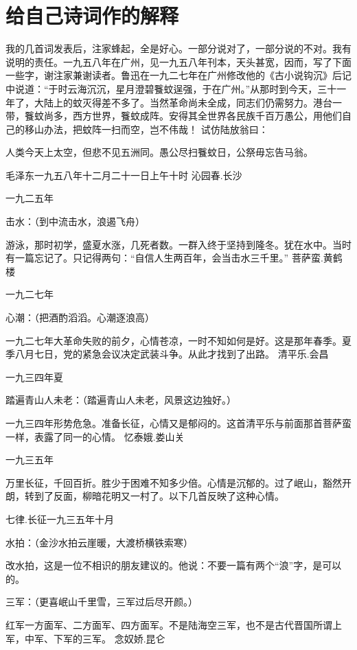 \section[给自己诗词作的解释 ]{给自己诗词作的解释 }


我的几首词发表后，注家蜂起，全是好心。一部分说对了，一部分说的不对。我有说明的责任。一九五八年在广州，见一九五八年刊本，天头甚宽，因而，写了下面一些字，谢注家兼谢读者。鲁迅在一九二七年在广州修改他的《古小说钩沉》后记中说道：“于时云海沉沉，星月澄碧餮蚊逞强，于在广州。”从那时到今天，三十一年了，大陆上的蚊灭得差不多了。当然革命尚未全成，同志们仍需努力。港台一带，餮蚊尚多，西方世界，餮蚊成阵。安得其全世界各民族千百万愚公，用他们自己的移山办法，把蚊阵一扫而空，岂不伟哉！
试仿陆放翁曰：

人类今天上太空，但悲不见五洲同。愚公尽扫餮蚊日，公祭毋忘告马翁。

毛泽东一九五八年十二月二十一日上午十时
沁园春.长沙

一九二五年

击水：（到中流击水，浪遏飞舟）

游泳，那时初学，盛夏水涨，几死者数。一群入终于坚持到隆冬。犹在水中。当时有一篇忘记了。只记得两句：“自信人生两百年，会当击水三千里。”
菩萨蛮.黄鹤楼

一九二七年

心潮：（把酒酌滔滔。心潮逐浪高）

一九二七年大革命失败的前夕，心情苍凉，一时不知如何是好。这是那年春季。夏季八月七日，党的紧急会议决定武装斗争。从此才找到了出路。
清平乐.会昌

一九三四年夏

踏遍青山人未老：（踏遍青山人未老，风景这边独好。）

一九三四年形势危急。准备长征，心情又是郁闷的。这首清平乐与前面那首菩萨蛮一样，表露了同一的心情。
忆泰娥.娄山关

一九三五年

万里长征，千回百折。胜少于困难不知多少倍。心情是沉郁的。过了岷山，豁然开朗，转到了反面，柳暗花明又一村了。以下几首反映了这种心情。

七律.长征一九三五年十月

水拍：（金沙水拍云崖暖，大渡桥横铁索寒）

改水拍，这是一位不相识的朋友建议的。他说：不要一篇有两个“浪”字，是可以的。


三军：（更喜岷山千里雪，三军过后尽开颜。）

红军一方面军、二方面军、四方面军。不是陆海空三军，也不是古代晋国所谓上军，中军、下军的三军。
念奴娇.昆仑

